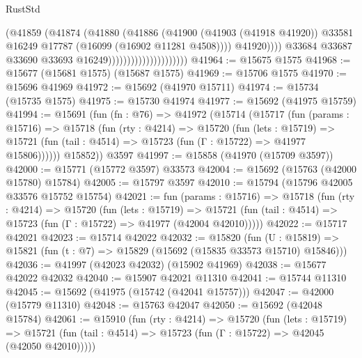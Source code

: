 \begin{lexlean}{RustStd}
\begin{coremodule}
                                                (@41859
                                                  (@41874
                                                    (@41880
                                                      (@41886
                                                        (@41900
                                                          (@41903 (@41918 @41920))
                                                          @33581
                                                          @16249
                                                          @17787
                                                          (@16099 (@16902 @11281 @4508))))
                                                      @41920))))
                                              @33684
                                              @33687
                                              @33690
                                              @33693
                                              @16249)))))))))))))))))))))
@41964 := @15675 @1575
@41968 := @15677 (@15681 @1575) (@15687 @1575)
@41969 := @15706 @1575
@41970 := @15696 @41969
@41972 := @15692 (@41970 @15711)
@41974 := @15734 (@15735 @1575)
@41975 := @15730 @41974
@41977 := @15692 (@41975 @15759)
@41994 := @15691
    (fun (fn : @76) =>
    @41972
      (@15714
        (@15717
          (fun (params : @15716) =>
          @15718
            (fun (rty : @4214) =>
            @15720
              (fun (lets : @15719) =>
              @15721 (fun (tail : @4514) => @15723 (fun (Γ : @15722) => @41977 @15806))))))
        @15852))
    @3597
@41997 := @15858 (@41970 (@15709 @3597))
@42000 := @15771 (@15772 @3597) @33573
@42004 := @15692 (@15763 (@42000 @15780) @15784)
@42005 := @15797 @3597
@42010 := @15794 (@15796 @42005 @33576 @15752 @15754)
@42021 := fun (params : @15716) =>
  @15718
    (fun (rty : @4214) =>
    @15720
      (fun (lets : @15719) =>
      @15721 (fun (tail : @4514) => @15723 (fun (Γ : @15722) => @41977 (@42004 @42010)))))
@42022 := @15717 @42021
@42023 := @15714 @42022
@42032 := @15820
    (fun (U : @15819) => @15821 (fun (t : @7) => @15829 (@15692 (@15835 @33573 @15710) @15846)))
@42036 := @41997 (@42023 @42032) (@15902 @41969)
@42038 := @15677 @42022 @42032
@42040 := @15907 @42021 @11310
@42041 := @15744 @11310
@42045 := @15692 (@41975 (@15742 (@42041 @15757)))
@42047 := @42000 (@15779 @11310)
@42048 := @15763 @42047
@42050 := @15692 (@42048 @15784)
@42061 := @15910
    (fun (rty : @4214) =>
    @15720
      (fun (lets : @15719) =>
      @15721 (fun (tail : @4514) => @15723 (fun (Γ : @15722) => @42045 (@42050 @42010)))))

\end{coremodule}
\end{lexlean}
